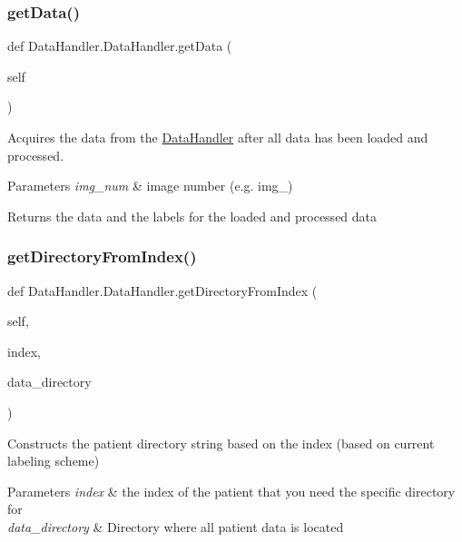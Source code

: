 \subsubsection{\texorpdfstring{get\+Data()}{getData()}}
{\footnotesize\ttfamily def Data\+Handler.\+Data\+Handler.\+get\+Data (\begin{DoxyParamCaption}\item[{}]{self }\end{DoxyParamCaption})}



Acquires the data from the \mbox{\hyperlink{classDataHandler_1_1DataHandler}{Data\+Handler}} after all data has been loaded and processed. 


\begin{DoxyParams}{Parameters}
{\em img\+\_\+num} & image number (e.\+g. img\+\_) \\
\hline
\end{DoxyParams}
\begin{DoxyReturn}{Returns}
the data and the labels for the loaded and processed data 
\end{DoxyReturn}
\mbox{\label{classDataHandler_1_1DataHandler_afd589c1c68b4189c4ec6f7ff1d7dd81f}} 
\subsubsection{\texorpdfstring{get\+Directory\+From\+Index()}{getDirectoryFromIndex()}}
{\footnotesize\ttfamily def Data\+Handler.\+Data\+Handler.\+get\+Directory\+From\+Index (\begin{DoxyParamCaption}\item[{}]{self,  }\item[{}]{index,  }\item[{}]{data\+\_\+directory }\end{DoxyParamCaption})}



Constructs the patient directory string based on the index (based on current labeling scheme) 


\begin{DoxyParams}{Parameters}
{\em index} & the index of the patient that you need the specific directory for \\
\hline
{\em data\+\_\+directory} & Directory where all patient data is located \\
\hline
\end{DoxyParams}
\mbox{\label{classDataHandler_1_1DataHandler_a450a64dad593d331764744b305818d0d}} 
